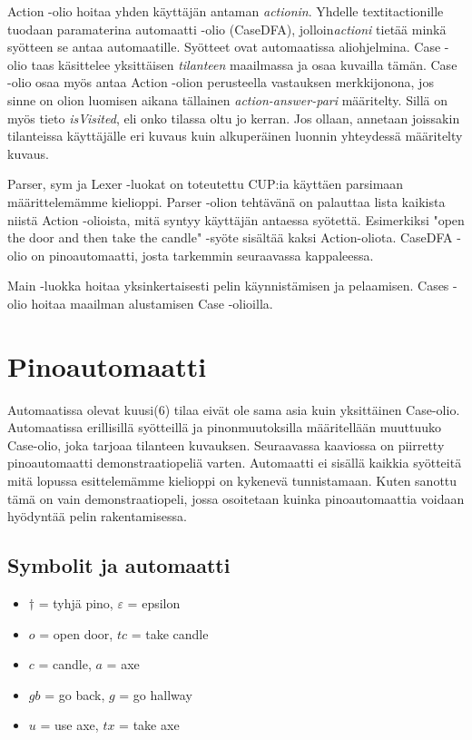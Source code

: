 \documentclass[a4paper,12pt,finnish]{article}
\begin{document}
Action -olio hoitaa yhden käyttäjän antaman \textit{actionin}. Yhdelle textit{actionille} tuodaan paramaterina automaatti -olio (CaseDFA), 
jolloin\textit{actioni} tietää minkä syötteen se antaa automaatille. Syötteet ovat automaatissa aliohjelmina. Case -olio taas
käsittelee yksittäisen \textit{tilanteen} maailmassa ja osaa kuvailla tämän. Case -olio osaa myös antaa Action -olion perusteella
vastauksen merkkijonona, jos sinne on olion luomisen aikana tällainen \textit{action-answer-pari} määritelty. Sillä on myös tieto \textit{isVisited},
eli onko tilassa oltu jo kerran. Jos ollaan, annetaan joissakin tilanteissa käyttäjälle eri kuvaus kuin alkuperäinen luonnin yhteydessä
määritelty kuvaus.

Parser, sym ja Lexer -luokat on toteutettu CUP:ia käyttäen parsimaan määrittelemämme kielioppi. Parser -olion tehtävänä
on palauttaa lista kaikista niistä Action -olioista, mitä syntyy käyttäjän antaessa syötettä. Esimerkiksi "open the door and then
take the candle" -syöte sisältää kaksi Action-oliota. CaseDFA -olio on pinoautomaatti, josta tarkemmin seuraavassa kappaleessa.

Main -luokka hoitaa yksinkertaisesti pelin käynnistämisen ja pelaamisen. Cases -olio hoitaa maailman alustamisen Case -olioilla.

\section {Pinoautomaatti}

Automaatissa olevat kuusi(6) tilaa eivät ole sama asia kuin yksittäinen Case-olio. Automaatissa erillisillä syötteillä ja pinonmuutoksilla
määritellään muuttuuko Case-olio, joka tarjoaa tilanteen kuvauksen. Seuraavassa kaaviossa on piirretty pinoautomaatti demonstraatiopeliä
varten. Automaatti ei sisällä kaikkia syötteitä mitä lopussa esittelemämme kielioppi on kykenevä tunnistamaan. Kuten sanottu tämä on vain demonstraatiopeli,
jossa osoitetaan kuinka pinoautomaattia voidaan hyödyntää pelin rakentamisessa.

\newpage
\subsection {Symbolit ja automaatti}
\begin{itemize}

\item $\dagger$ = tyhjä pino, $\varepsilon$ = epsilon
\item $o$ = open door, $tc$ = take candle
\item $c$ = candle, $a$ = axe
 \item $gb$ = go back, $g$ = go hallway
 \item $u$ = use axe, $tx$ = take axe
\end{itemize}
\end{document}
